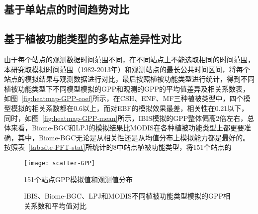 \subsection{基于单站点的时间趋势对比}


\subsection{基于植被功能类型的多站点差异性对比}
由于每个站点的观测数据时间范围不同，在不同站点上不能选取相同的时间范围，本研究取模拟时间范围（1982-2013年）和观测站点的最长公共时间区间，将每个站点的模拟结果与观测数据进行对比，最后按照植被功能类型进行统计，得到不同植被功能类型下不同模型模拟的GPP和观测的GPP的平均值差异及相关系数表，如图~\ref{fig:heatmap-GPP-coef}所示，在CSH、ENF、MF三种植被类型中，四个模型模拟的相关系数都在0.6以上，而对EBF的模拟效果最差，相关性在0.21以下，同时，如图~\ref{fig:heatmap-GPP-mean}所示，IBIS模拟的GPP整体偏高2倍左右，总体来看，Biome-BGC和LPJ的模拟结果比MODIS在各种植被功能类型上都更要准确，其中，Biome-BGC无论是从相关性还是从均值分布上模拟能力都是最好的。
按照表~\ref{tab:site-PFT-stat}所统计的8中站点植被功能类型，将151个站点的

\begin{figure}[!htbp]
    \centering
    \texttt{[image: scatter-GPP]}
    \caption{151个站点GPP模拟值和观测值分布}
    \label{fig:api-gateway-children}
\end{figure}

\begin{figure}[!htbp]
    \centering
    \hfill
    \caption{IBIS、Biome-BGC、LPJ和MODIS不同植被功能类型模拟的GPP相关系数和平均值对比}
    \label{fig:heatmap-coef-mean}
\end{figure}

